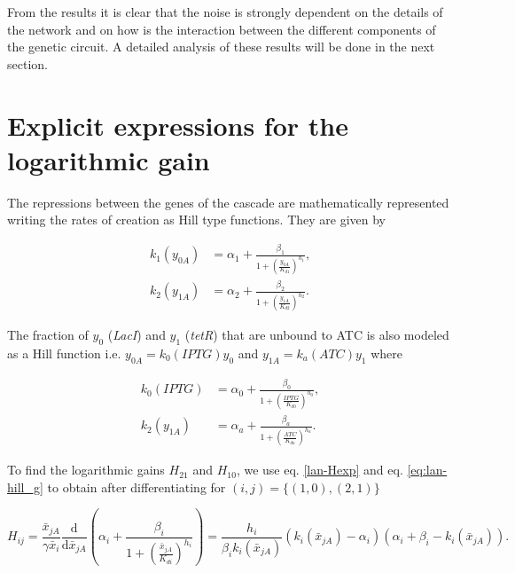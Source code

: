 From the results it is clear that the noise is strongly dependent on the details of the network and on how is the interaction between the different components of the genetic circuit. A detailed analysis of these results will be done in the next section.

\section{Explicit expressions for the logarithmic gain}

The repressions between the genes of the cascade are mathematically represented writing the rates of creation as Hill type functions. They are given by

\begin{equation}
  \label{eq:lan-hill_g}
  \begin{split}
    k_1(y_{0A}) &= \alpha_1 + \frac{\beta_1}{1+(\frac{y_{0A}}{K_{d1}})^{h_1}},\\
    k_2(y_{1A}) &= \alpha_2 + \frac{\beta_2}{1+(\frac{y_{1A}}{K_{d2}})^{h_2}}.
\end{split}
  \end{equation}

The fraction of $y_0$ (\textit{LacI}) and $y_1$ (\textit{tetR}) that are unbound to ATC is also modeled as a Hill function i.e. $y_{0A} = k_0(IPTG)y_0$ and $y_{1A} = k_a(ATC)y_1$ where

\begin{equation}
  \begin{split}
    k_0(IPTG) &= \alpha_0 + \frac{\beta_0}{1+(\frac{IPTG}{K_{d0}})^{h_0}},\\
    k_2(y_{1A}) &= \alpha_a + \frac{\beta_a}{1+(\frac{ATC}{K_{da}})^{h_a}}.
\end{split}
  \end{equation}

To find the logarithmic gains $H_{21}$ and $H_{10}$, we use eq. \eqref{lan-Hexp} and eq. \eqref{eq:lan-hill_g} to obtain after differentiating for $(i,j) = \{(1,0),(2,1)\}$

\begin{equation}
  \label{eq:lan-H_det}
  H_{ij} = \frac{\bar{x}_{jA}}{\gamma\bar{x}_i}\frac{\mathrm{d}}{\mathrm{d} \bar{x}_{jA}}\left( \alpha_i + \frac{\beta_i}{1+(\frac{\bar{x}_{jA}}{K_{di}})^{h_i}}\right) = \frac{h_i}{\beta_i k_i(\bar{x}_{jA})}\left(k_i(\bar{x}_{jA}) - \alpha_i\right) \left(\alpha_i+\beta_i-k_i(\bar{x}_{jA})\right).
\end{equation}

